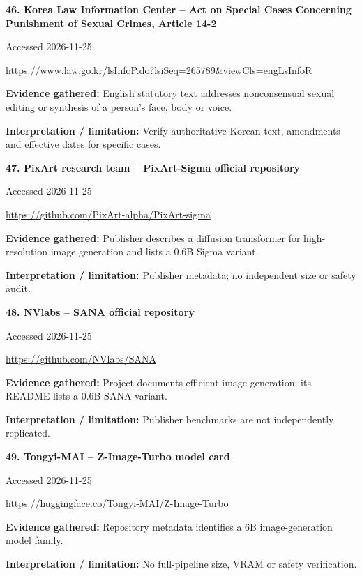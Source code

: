 \documentclass[11pt,a4paper]{article}
\begin{document}
\noindent\begin{minipage}{\linewidth}\textbf{46. Korea Law Information Center -- Act on Special Cases Concerning Punishment of Sexual Crimes, Article 14-2}\par{\small Accessed 2026-11-25\par\url{https://www.law.go.kr/lsInfoP.do?lsiSeq=265789&viewCls=engLsInfoR}}\par
\textbf{Evidence gathered:} English statutory text addresses nonconsensual sexual editing or synthesis of a person's face, body or voice.\par\textbf{Interpretation / limitation:} Verify authoritative Korean text, amendments and effective dates for specific cases.\par
\end{minipage}\par\vspace{2mm}
\noindent\begin{minipage}{\linewidth}\textbf{47. PixArt research team -- PixArt-Sigma official repository}\par{\small Accessed 2026-11-25\par\url{https://github.com/PixArt-alpha/PixArt-sigma}}\par
\textbf{Evidence gathered:} Publisher describes a diffusion transformer for high-resolution image generation and lists a 0.6B Sigma variant.\par\textbf{Interpretation / limitation:} Publisher metadata; no independent size or safety audit.\par
\end{minipage}\par\vspace{2mm}
\noindent\begin{minipage}{\linewidth}\textbf{48. NVlabs -- SANA official repository}\par{\small Accessed 2026-11-25\par\url{https://github.com/NVlabs/SANA}}\par
\textbf{Evidence gathered:} Project documents efficient image generation; its README lists a 0.6B SANA variant.\par\textbf{Interpretation / limitation:} Publisher benchmarks are not independently replicated.\par
\end{minipage}\par\vspace{2mm}
\noindent\begin{minipage}{\linewidth}\textbf{49. Tongyi-MAI -- Z-Image-Turbo model card}\par{\small Accessed 2026-11-25\par\url{https://huggingface.co/Tongyi-MAI/Z-Image-Turbo}}\par
\textbf{Evidence gathered:} Repository metadata identifies a 6B image-generation model family.\par\textbf{Interpretation / limitation:} No full-pipeline size, VRAM or safety verification.\par
\end{minipage}\par\vspace{2mm}
\end{document}

